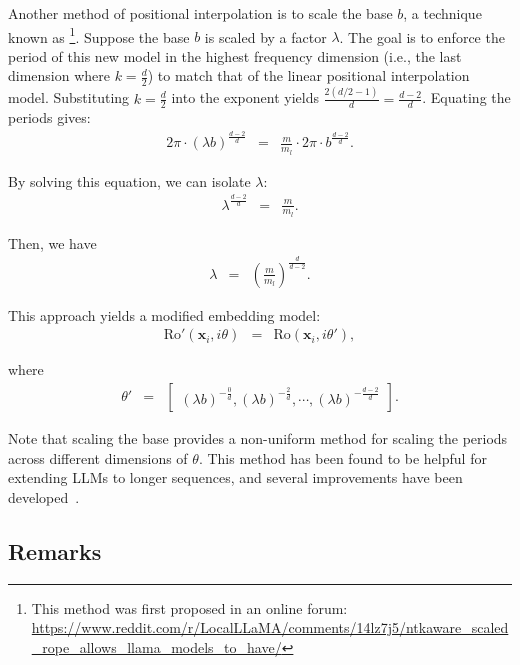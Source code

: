 Another method of positional interpolation is to scale the base $b$, a technique known as \footnote{This method was first proposed in an online forum: \url{https://www.reddit.com/r/LocalLLaMA/comments/14lz7j5/ntkaware_scaled_rope_allows_llama_models_to_have/}}. Suppose the base $b$ is scaled by a factor $\lambda$. The goal is to enforce the period of this new model in the highest frequency dimension (i.e., the last dimension where $k = \frac{d}{2}$) to match that of the linear positional interpolation model. Substituting $k = \frac{d}{2}$ into the exponent yields $\frac{2(d/2-1)}{d} = \frac{d-2}{d}$. Equating the periods gives:
\begin{eqnarray}
2\pi \cdot (\lambda b)^{\frac{d-2}{d}} & = & \frac{m}{m_l} \cdot 2\pi \cdot b^{\frac{d-2}{d}}.
\end{eqnarray}

By solving this equation, we can isolate $\lambda$:
\begin{eqnarray}
\lambda^{\frac{d-2}{d}} & = & \frac{m}{m_l}.
\end{eqnarray}

Then, we have
\begin{eqnarray}
\lambda & = & \left( \frac{m}{m_l} \right)^{\frac{d}{d-2}}.
\end{eqnarray}

This approach yields a modified embedding model:
\begin{eqnarray}
\mathrm{Ro}'(\mathbf{x}_i,i\theta) & = & \mathrm{Ro}(\mathbf{x}_i,i\theta'),
\end{eqnarray}

\noindent where
\begin{eqnarray}
\theta' & = & \begin{bmatrix} (\lambda b)^{-\frac{0}{d}}, (\lambda b)^{-\frac{2}{d}}, \cdots, (\lambda b)^{-\frac{d-2}{d}}\end{bmatrix}.
\end{eqnarray}

Note that scaling the base provides a non-uniform method for scaling the periods across different dimensions of $\theta$. This method has been found to be helpful for extending LLMs to longer sequences, and several improvements have been developed~\cite{peng-etal:2024yarn,ding-etal:2024longrope}.

\subsection{Remarks}
\label{sec:long-context-llm-remarks}

